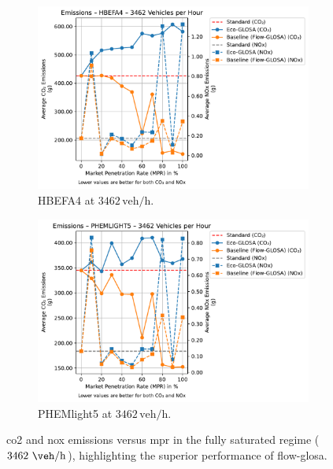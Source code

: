 \begin{figure}[htb]
  \centering
  \begin{subfigure}[b]{0.45\textwidth}
    \includegraphics[width=\textwidth]{data/img/Emissions/Emissions_HBEFA4_Cars3462.pdf}
    \caption{HBEFA4 at $3462\,\mathrm{veh/h}$.}
    \label{fig:Emis_3462_HBEFA4}
  \end{subfigure}\hfill
  \begin{subfigure}[b]{0.45\textwidth}
    \includegraphics[width=\textwidth]{data/img/Emissions/Emissions_PHEMLIGHT5_Cars3462.pdf}
    \caption{PHEMlight5 at $3462\,\mathrm{veh/h}$.}
    \label{fig:Emis_3462_PHEM}
  \end{subfigure}
  \caption[\ac{co2} and \ac{nox} emissions vs. \ac{mpr} at $3462~\unit{\veh\per\hour}$]{\ac{co2} and \ac{nox} emissions versus \ac{mpr} in the fully saturated regime ($3462~\unit{\veh\per\hour}$), highlighting the superior performance of \ac{flow-glosa}.}
  \label{fig:Emis_3462}
\end{figure}

